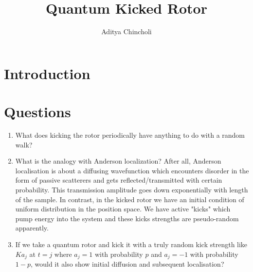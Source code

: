 \documentclass[]{article}
\title{Quantum Kicked Rotor}
\author{Aditya Chincholi}
\begin{document}
\maketitle

\section{Introduction}

\section{Questions}
\begin{enumerate}
    \item What does kicking the rotor periodically have anything to do with a random walk?
    
    \item What is the analogy with Anderson localization? After all, Anderson localisation
    is about a diffusing wavefunction which encounters disorder in the form of passive scatterers
    and gets reflected/transmitted with certain probability. This transmission amplitude goes down
    exponentially with length of the sample. In contrast, in the kicked rotor we have an initial
    condition of uniform distribution in the position space. We have active "kicks" which pump
    energy into the system and these kicks strengths are pseudo-random apparently.
    
    \item If we take a quantum rotor and kick it with a truly random kick strength like $Ka_j$ at $t = j$
    where $a_j = 1$ with probability $p$ and $a_j = -1$ with probability $1-p$, would it also show initial
    diffusion and subsequent localisation?
\end{enumerate}
\end{document}

